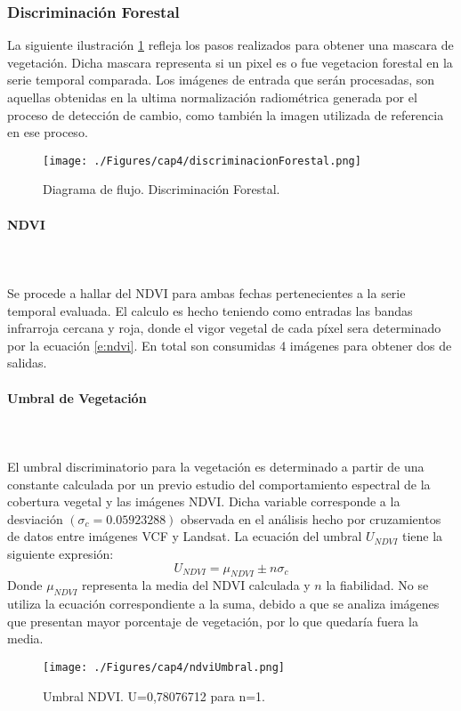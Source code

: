 \subsubsection{Discriminaci\'on Forestal}
La siguiente ilustraci\'on \ref{fig:discrimForestal} refleja los pasos realizados para obtener una mascara de vegetaci\'on. Dicha mascara representa si un pixel es o fue vegetacion forestal en la serie temporal comparada. Los im\'agenes de entrada que ser\'an procesadas, son aquellas obtenidas en la ultima normalizaci\'on radiom\'etrica generada por el proceso de detecci\'on de cambio, como tambi\'en la imagen utilizada de referencia en ese proceso.
\begin{figure}[H]
	\centering
	\texttt{[image: ./Figures/cap4/discriminacionForestal.png]}
	\caption{Diagrama de flujo. Discriminaci\'on Forestal.}
	\label{fig:discrimForestal}
\end{figure}

\paragraph{NDVI}\mbox{}\\\mbox{}\\
Se procede a hallar del NDVI para ambas fechas pertenecientes a la serie temporal evaluada. El calculo es hecho teniendo como entradas las bandas infrarroja cercana y roja, donde el vigor vegetal de cada p\'ixel sera determinado por la ecuaci\'on \ref{e:ndvi}. En total son consumidas 4 im\'agenes para obtener dos de salidas.
\paragraph{Umbral de Vegetaci\'on}\label{sec:uvegetacion}\mbox{}\\\mbox{}\\
El umbral discriminatorio para la vegetaci\'on es determinado a partir de una constante calculada por un previo estudio del comportamiento espectral de la cobertura vegetal y las im\'agenes NDVI. Dicha variable corresponde a la desviaci\'on $(\sigma_{c} = 0.05923288)  $ observada en el an\'alisis hecho por cruzamientos de datos entre im\'agenes VCF y Landsat. La ecuaci\'on del umbral $ U_{NDVI} $ tiene la siguiente expresi\'on:
		\begin{equation}
		U_{NDVI} = \mu_{NDVI}\pm n \sigma_{c}
		\end{equation}
Donde $ \mu_{NDVI} $ representa la media del NDVI calculada y $ n $ la fiabilidad. No se utiliza la ecuaci\'on correspondiente a la suma, debido a que se analiza im\'agenes que presentan mayor porcentaje de vegetaci\'on, por lo que quedaría fuera la media.
\begin{figure}[H]
	\centering
	\texttt{[image: ./Figures/cap4/ndviUmbral.png]}
	\caption{Umbral NDVI. U=0,78076712 para n=1.}
	\label{fig:ndviUmbral}
\end{figure}


